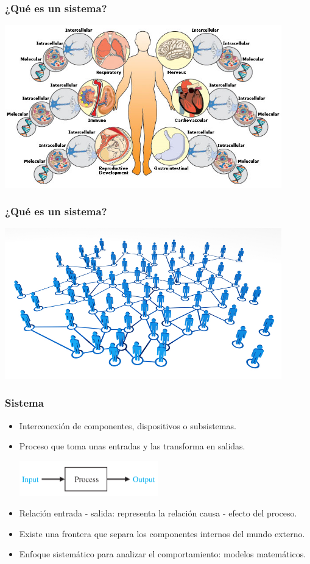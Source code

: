 \documentclass[aspectratio=169,handout]{beamer}
\theoremstyle{definition}
\theoremstyle{plain}
\theoremstyle{remark}
\begin{document}
\begin{frame}[<+->][c]\frametitle{¿Qué es un sistema?}
\begin{center}
  \includegraphics[width=12cm]{images/biologySistem.png}
\end{center}  
\end{frame}

\begin{frame}[<+->][c]\frametitle{¿Qué es un sistema?}
\begin{center}
  \includegraphics[width=12cm]{images/socialNetwork.png}
\end{center}  
\end{frame}

\begin{frame}[<+->][c]\frametitle{Sistema}
\begin{itemize}
  \item Interconexión de componentes, dispositivos o subsistemas.
  \item Proceso que toma unas entradas y las transforma en salidas.
  \begin{center}
    \includegraphics[width=6cm]{images/sistema.png}
  \end{center}
  \item Relación entrada - salida: representa la relación causa - efecto del proceso.
  \item Existe una frontera que separa los componentes internos del mundo externo.
  \item Enfoque sistemático para analizar el comportamiento: modelos matemáticos.
\end{itemize} 
\end{frame}
\end{document}
